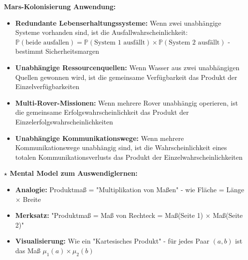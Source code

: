 \begin{denoobification}[Produktmaß]
\textbf{Mars-Kolonisierung Anwendung:}
\begin{itemize}
    \item \textbf{Redundante Lebenserhaltungssysteme:} Wenn zwei unabhängige Systeme vorhanden sind, ist die Ausfallwahrscheinlichkeit: $\mathbb{P}(\text{beide ausfallen}) = \mathbb{P}(\text{System 1 ausfällt}) \times \mathbb{P}(\text{System 2 ausfällt})$ - bestimmt Sicherheitsmargen
    \item \textbf{Unabhängige Ressourcenquellen:} Wenn Wasser aus zwei unabhängigen Quellen gewonnen wird, ist die gemeinsame Verfügbarkeit das Produkt der Einzelverfügbarkeiten
    \item \textbf{Multi-Rover-Missionen:} Wenn mehrere Rover unabhängig operieren, ist die gemeinsame Erfolgswahrscheinlichkeit das Produkt der Einzelerfolgswahrscheinlichkeiten
    \item \textbf{Unabhängige Kommunikationswege:} Wenn mehrere Kommunikationswege unabhängig sind, ist die Wahrscheinlichkeit eines totalen Kommunikationsverlusts das Produkt der Einzelwahrscheinlichkeiten
\end{itemize}

\textbf{$\star$ Mental Model zum Auswendiglernen:}
\begin{itemize}
    \item \textbf{Analogie:} Produktmaß = "Multiplikation von Maßen" - wie Fläche = Länge × Breite
    \item \textbf{Merksatz:} "Produktmaß = Maß von Rechteck = Maß(Seite 1) × Maß(Seite 2)"
    \item \textbf{Visualisierung:} Wie ein "Kartesisches Produkt" - für jedes Paar $(a,b)$ ist das Maß $\mu_1(a) \times \mu_2(b)$
\end{itemize}

\begin{center}
\end{center}
\end{denoobification}

